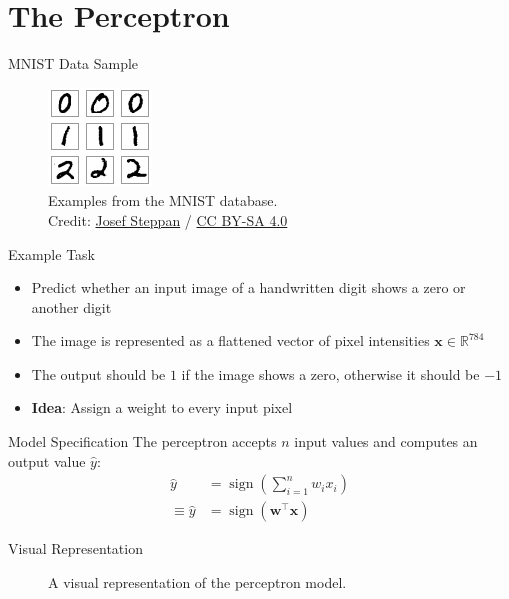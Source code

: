 \documentclass{beamer}
\DeclareMathOperator{\sign}{sign}
\begin{document}
	\section{The Perceptron}
	\begin{frame}{MNIST Data Sample}
		\begin{figure}
			\includegraphics[scale=1.6]{img/mnist}
			\caption{Examples from the {MNIST} database. \\Credit: 
				\href{https://commons.wikimedia.org/wiki/File:MnistExamples.png}{Josef Steppan}
				/ \href{https://creativecommons.org/licenses/by-sa/4.0/deed.en}{CC BY-SA 4.0}}
		\end{figure}
	\end{frame}
	\begin{frame}{Example Task}
		\begin{itemize}
			\item <1-> Predict whether an input image of a handwritten digit shows a zero or another digit
			\item <2-> The image is represented as a flattened vector of pixel intensities $\bm{x} \in \mathbb{R}^{784}$
			\item <3-> The output should be $1$ if the image shows a zero, otherwise it should be $-1$
			\item <4-> \textbf{Idea}: Assign a weight to every input pixel
		\end{itemize}
	\end{frame}
	\begin{frame}{Model Specification}
		The perceptron accepts $n$ input values and computes an output value $\hat{y}$:
		\begin{equation}
			\begin{split}
			\hat{y} &= \sign\left (\sum_{i=1}^{n} w_ix_i\right )\\
			\equiv \hat{y} &= \sign\left (\bm{w}^\top\bm{x}\right )
			\end{split}
		\end{equation}
	\end{frame}
	\begin{frame}{Visual Representation}
		\begin{figure}
			
			\caption{A visual representation of the perceptron model.}
		\end{figure}
	\end{frame}
\end{document}
